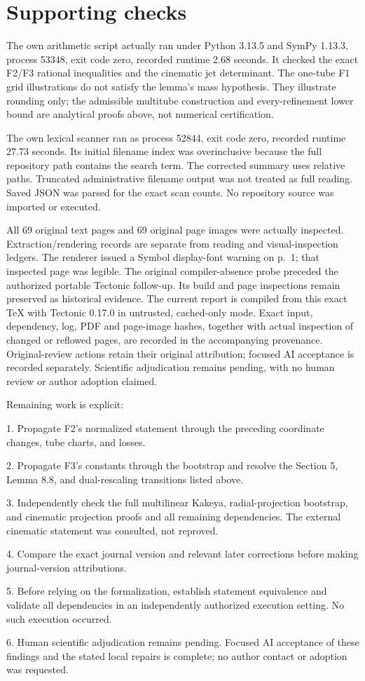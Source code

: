 \documentclass[10pt]{article}
\begin{document}
\section*{Supporting checks}
The own arithmetic script actually ran under Python 3.13.5 and SymPy 1.13.3, process 53348, exit code zero, recorded runtime 2.68 seconds. It checked the exact F2/F3 rational inequalities and the cinematic jet determinant. The one-tube F1 grid illustrations do not satisfy the lemma’s mass hypothesis. They illustrate rounding only; the admissible multitube construction and every-refinement lower bound are analytical proofs above, not numerical certification.\par
The own lexical scanner ran as process 52844, exit code zero, recorded runtime 27.73 seconds. Its initial filename index was overinclusive because the full repository path contains the search term. The corrected summary uses relative paths. Truncated administrative filename output was not treated as full reading. Saved JSON was parsed for the exact scan counts. No repository source was imported or executed.\par
All 69 original text pages and 69 original page images were actually inspected. Extraction/rendering records are separate from reading and visual-inspection ledgers. The renderer issued a Symbol display-font warning on p. 1; that inspected page was legible. The original compiler-absence probe preceded the authorized portable Tectonic follow-up. Its build and page inspections remain preserved as historical evidence. The current report is compiled from this exact TeX with Tectonic 0.17.0 in untrusted, cached-only mode. Exact input, dependency, log, PDF and page-image hashes, together with actual inspection of changed or reflowed pages, are recorded in the accompanying provenance. Original-review actions retain their original attribution; focused AI acceptance is recorded separately. Scientific adjudication remains pending, with no human review or author adoption claimed.\par
Remaining work is explicit:\par
1. Propagate F2’s normalized statement through the preceding coordinate changes, tube charts, and losses.\par
2. Propagate F3’s constants through the bootstrap and resolve the Section 5, Lemma 8.8, and dual-rescaling transitions listed above.\par
3. Independently check the full multilinear Kakeya, radial-projection bootstrap, and cinematic projection proofs and all remaining dependencies. The external cinematic statement was consulted, not reproved.\par
4. Compare the exact journal version and relevant later corrections before making journal-version attributions.\par
5. Before relying on the formalization, establish statement equivalence and validate all dependencies in an independently authorized execution setting. No such execution occurred.\par
6. Human scientific adjudication remains pending. Focused AI acceptance of these findings and the stated local repairs is complete; no author contact or adoption was requested.\par
\end{document}
